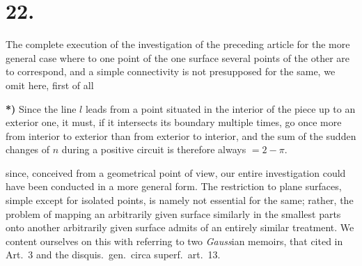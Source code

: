 \documentclass{article}
\begin{document}
\section*{22.}

The complete execution of the investigation of the preceding article for the more general case where to one point of the one surface several points of the other are to correspond, and a simple connectivity is not presupposed for the same, we omit here, first of all

\textbf{*)} Since the line $l$ leads from a point situated in the interior of the piece up to an exterior one, it must, if it intersects its boundary multiple times, go once more from interior to exterior than from exterior to interior, and the sum of the sudden changes of $n$ during a positive circuit is therefore always $= 2 - \pi$.

since, conceived from a geometrical point of view, our entire investigation could have been conducted in a more general form. The restriction to plane surfaces, simple except for isolated points, is namely not essential for the same; rather, the problem of mapping an arbitrarily given surface similarly in the smallest parts onto another arbitrarily given surface admits of an entirely similar treatment. We content ourselves on this with referring to two \emph{Gauss}ian memoirs, that cited in Art.~3 and the disquis.\ gen.\ circa superf.\ art.~13.
\end{document}
